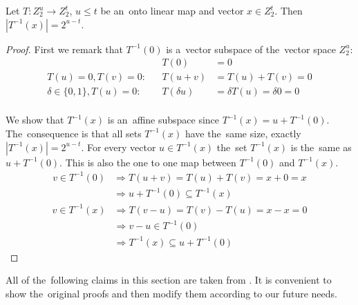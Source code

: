 \begin{lemma}
\label{lemma-linear-transformation-domain-distribution}
Let $T: Z_2^u \rightarrow Z_2^t$, $u \leq t$ be an~onto linear map and vector $x \in Z_2^t$. Then $|T^{-1}(x)| = 2 ^ {u-t}$.
\end{lemma}
\begin{proof}
First we remark that $T^{-1}(0)$ is a~vector subspace of the~vector space $Z_2^u$:
\begin{align*}
&\textit{}& T(0) & = 0 \\
T(u) = 0, T(v) = 0: &\textit{}& T(u + v) & = T(u) + T(v) = 0 \\
\delta \in \lbrace 0, 1 \rbrace, T(u) = 0: &\textit{}& T(\delta u) & = \delta T(u) = \delta 0 = 0 \\
\end{align*}

We show that $T^{-1}(x)$ is an~affine subspace since $T^{-1}(x) = u + T^{-1}(0)$. The~consequence is that all sets $T^{-1}(x)$ have the~same size, exactly $|T^{-1}(x)| = 2^{u-t}$. For every vector $u \in T^{-1}(x)$ the~set $T^{-1}(x)$ is the~same as $u + T^{-1}(0)$. This is also the one to one map between $T^{-1}(0)$ and $T^{-1}(x)$.
\begin{displaymath}
\begin{split}
v \in T^{-1}(0) 
	& \Rightarrow T(u+v) = T(u) + T(v) = x + 0 = x  \\
	& \Rightarrow u + T^{-1}(0) \subseteq T^{-1}(x)
\end{split}
\end{displaymath}
\begin{displaymath}
\begin{split}
v \in T^{-1}(x) 
	& \Rightarrow T(v-u) = T(v) - T(u) = x - x = 0 \\
	& \Rightarrow v - u \in T^{-1}(0) \\
	& \Rightarrow T^{-1}(x) \subseteq u + T^{-1}(0)
\end{split}
\end{displaymath}
\end{proof}

All of the~following claims in this section are taken from \cite{DBLP:journals/jacm/AlonDMPT99}. It is convenient to show the~original proofs and then modify them according to our future needs.

